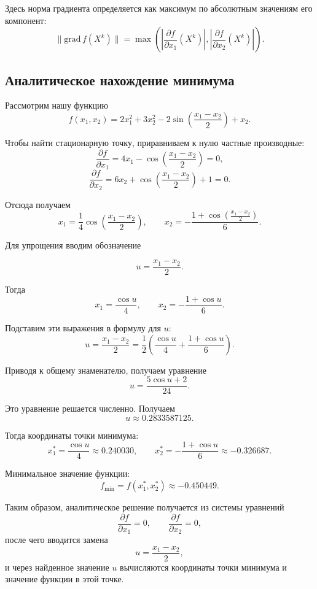 Здесь норма градиента определяется как максимум по абсолютным значениям его компонент:
\[
\|\mathrm{grad}\,f(X^k)\|=
\max\left(
\left|\frac{\partial f}{\partial x_1}(X^k)\right|,
\left|\frac{\partial f}{\partial x_2}(X^k)\right|
\right).
\]

\subsection*{Аналитическое нахождение минимума}

Рассмотрим нашу функцию
\[
f(x_1,x_2)=2x_1^2+3x_2^2-2\sin\left(\frac{x_1-x_2}{2}\right)+x_2.
\]

Чтобы найти стационарную точку, приравниваем к нулю частные производные:
\[
\frac{\partial f}{\partial x_1}=4x_1-\cos\left(\frac{x_1-x_2}{2}\right)=0,
\]
\[
\frac{\partial f}{\partial x_2}=6x_2+\cos\left(\frac{x_1-x_2}{2}\right)+1=0.
\]

Отсюда получаем
\[
x_1=\frac{1}{4}\cos\left(\frac{x_1-x_2}{2}\right),
\qquad
x_2=-\frac{1+\cos\left(\frac{x_1-x_2}{2}\right)}{6}.
\]

Для упрощения вводим обозначение

\[
u=\frac{x_1-x_2}{2}.
\]

Тогда
\[
x_1=\frac{\cos u}{4},
\qquad
x_2=-\frac{1+\cos u}{6}.
\]

Подставим эти выражения в формулу для \(u\):
\[
u=\frac{x_1-x_2}{2}
=
\frac{1}{2}
\left(
\frac{\cos u}{4}
+
\frac{1+\cos u}{6}
\right).
\]

Приводя к общему знаменателю, получаем уравнение
\[
u=\frac{5\cos u+2}{24}.
\]

Это уравнение решается численно. Получаем
\[
u \approx 0.2833587125.
\]

Тогда координаты точки минимума:
\[
x_1^*=\frac{\cos u}{4}\approx 0.240030,
\qquad
x_2^*=-\frac{1+\cos u}{6}\approx -0.326687.
\]

Минимальное значение функции:
\[
f_{\min}=f(x_1^*,x_2^*)\approx -0.450449.
\]


Таким образом, аналитическое решение получается из системы уравнений
\[
\frac{\partial f}{\partial x_1}=0,
\qquad
\frac{\partial f}{\partial x_2}=0,
\]
после чего вводится замена
\[
u=\frac{x_1-x_2}{2},
\]
и через найденное значение \(u\) вычисляются координаты точки минимума и значение функции в этой точке.

